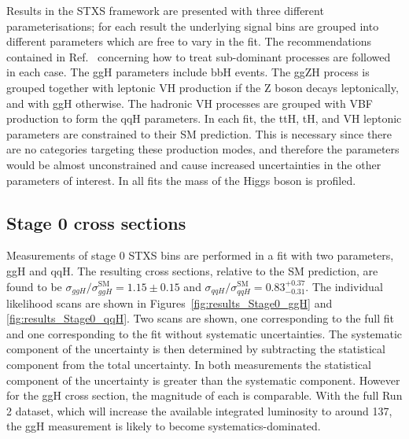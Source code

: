 Results in the STXS framework are presented with three different parameterisations;
for each result the underlying signal bins 
are grouped into different parameters which are free to vary in the fit.
The recommendations contained in Ref.~\cite{YR4} 
concerning how to treat sub-dominant processes are followed in each case.
The ggH parameters include bbH events.
The ggZH process is grouped together with leptonic VH production if the Z boson decays leptonically, 
and with ggH otherwise.
The hadronic VH processes are grouped with VBF production to form the qqH parameters.
In each fit, the ttH, tH, and VH leptonic parameters are constrained to their SM prediction. 
This is necessary since there are no categories targeting these production modes, 
and therefore the parameters would be almost unconstrained 
and cause increased uncertainties in the other parameters of interest.
In all fits the mass of the Higgs boson is profiled.

\subsection{Stage 0 cross sections}
Measurements of stage 0 STXS bins are performed in a fit with two parameters, ggH and qqH.
The resulting cross sections, relative to the SM prediction, are found to be 
$\sigma_{ggH}/\sigma_{ggH}^{\textrm{SM}} = 1.15 \pm 0.15$ 
and $\sigma_{qqH}/\sigma_{qqH}^{\textrm{SM}} = 0.83_{-0.31}^{+0.37}$.
The individual likelihood scans are shown 
in Figures~\ref{fig:results_Stage0_ggH} and \ref{fig:results_Stage0_qqH}.
Two scans are shown, one corresponding to the full fit
and one corresponding to the fit without systematic uncertainties.
The systematic component of the uncertainty is then determined 
by subtracting the statistical component from the total uncertainty.
In both measurements the statistical component of the uncertainty 
is greater than the systematic component.
However for the ggH cross section, the magnitude of each is comparable.
With the full Run 2 dataset, 
which will increase the available integrated luminosity to around \SI{137}{\fbinv}, 
the ggH measurement is likely to become systematics-dominated.

